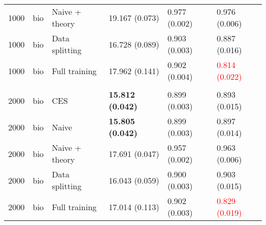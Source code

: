 \begin{tabular}[t]{rlllll}
\hspace{1em}1000 & bio & Naive + theory & 19.167 (0.073) & 0.977 (0.002) & 0.976 (0.006)\\
\hspace{1em}1000 & bio & Data splitting & 16.728 (0.089) & 0.903 (0.003) & 0.887 (0.016)\\
\hspace{1em}1000 & bio & Full training & 17.962 (0.141) & 0.902 (0.004) & \textcolor{red}{0.814 (0.022)}\\
\addlinespace[0.3em]
\multicolumn{6}{l}{\textbf{2000}}\\
\hspace{1em}2000 & bio & CES & \textbf{15.812 (0.042)} & 0.899 (0.003) & 0.893 (0.015)\\
\hspace{1em}2000 & bio & Naive & \textbf{15.805 (0.042)} & 0.899 (0.003) & 0.897 (0.014)\\
\hspace{1em}2000 & bio & Naive + theory & 17.691 (0.047) & 0.957 (0.002) & 0.963 (0.006)\\
\hspace{1em}2000 & bio & Data splitting & 16.043 (0.059) & 0.900 (0.003) & 0.903 (0.015)\\
\hspace{1em}2000 & bio & Full training & 17.014 (0.113) & 0.902 (0.003) & \textcolor{red}{0.829 (0.019)}\\
\bottomrule
\end{tabular}
